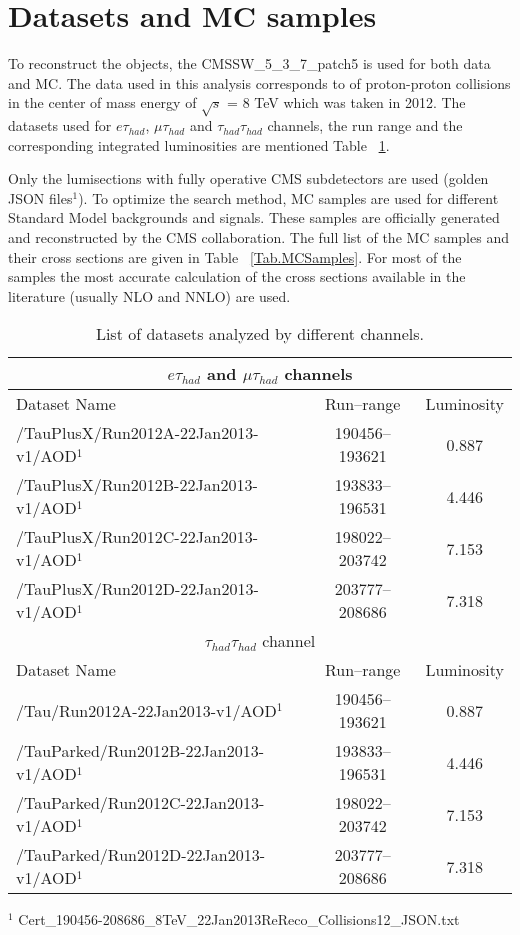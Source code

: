 \section{Datasets and MC samples}
\label{sect:dataMC}
To reconstruct the objects, the CMSSW\_5\_3\_7\_patch5 is used for both data and MC.
The data used in this analysis corresponds to \IL of proton-proton collisions in the center of mass energy of $\sqrt{s}$ = 8 TeV 
which was taken in 2012. The datasets used for $e\tau_{had}$, $\mu\tau_{had}$ and $\tau_{had}\tau_{had}$ channels, the run range and the corresponding integrated luminosities are mentioned Table ~\ref{Tab.DataSamples}.

Only the lumisections with fully operative CMS subdetectors are used (golden JSON files$^{1}$). To optimize the search method, MC 
samples are used for different Standard Model backgrounds and signals. These samples are officially generated and reconstructed by the CMS
collaboration. The full list of the MC samples and their cross sections are given in Table ~\ref{Tab.MCSamples}. For most of the samples the most 
accurate calculation of the cross sections available in the literature (usually NLO and NNLO) are used. 



\begin{table}[!h]

\begin{center}
\small{
\begin{tabular}{|l|c|c|}
\hline
\multicolumn{3}{|c|}{$e\tau_{had}$ and $\mu\tau_{had}$ channels} \\
\hline
Dataset Name & Run--range & Luminosity \\
\hline
/TauPlusX/Run2012A-22Jan2013-v1/AOD$^{1}$   & 190456--193621 & 0.887\\
/TauPlusX/Run2012B-22Jan2013-v1/AOD$^{1}$   & 193833--196531 & 4.446\\
/TauPlusX/Run2012C-22Jan2013-v1/AOD$^{1}$   & 198022--203742 & 7.153\\
/TauPlusX/Run2012D-22Jan2013-v1/AOD$^{1}$   & 203777--208686 & 7.318\\
\hline
\hline
\multicolumn{3}{|c|}{$\tau_{had}\tau_{had}$ channel} \\
\hline
Dataset Name & Run--range & Luminosity \\
\hline
/Tau/Run2012A-22Jan2013-v1/AOD$^{1}$   & 190456--193621 & 0.887 \\
/TauParked/Run2012B-22Jan2013-v1/AOD$^{1}$ & 193833--196531 & 4.446 \\
/TauParked/Run2012C-22Jan2013-v1/AOD$^{1}$ & 198022--203742 & 7.153 \\
/TauParked/Run2012D-22Jan2013-v1/AOD$^{1}$ & 203777--208686 & 7.318 \\
\hline

\end{tabular}
}
\end{center}
$^{1}$ Cert\_190456-208686\_8TeV\_22Jan2013ReReco\_Collisions12\_JSON.txt \\
\caption{
  List of datasets analyzed by different channels.
}
\label{Tab.DataSamples}
\end{table}



